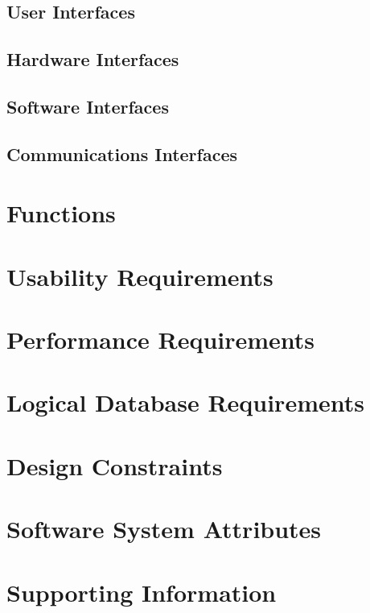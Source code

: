 \documentclass[a4paper, 10pt]{report}
\begin{document}
            \subsection{User Interfaces}
            \subsection{Hardware Interfaces}
            \subsection{Software Interfaces}
            \subsection{Communications Interfaces}
        \section{Functions}
        \section{Usability Requirements}
        \section{Performance Requirements}
        \section{Logical Database Requirements}
        \section{Design Constraints}
        \section{Software System Attributes}
        \section{Supporting Information}
    \pagebreak
\end{document}
